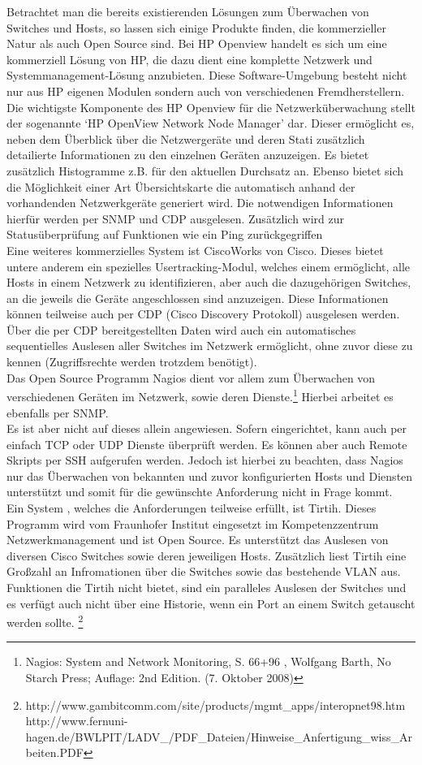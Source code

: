 Betrachtet man die bereits existierenden Lösungen zum Überwachen von Switches und Hosts, so lassen sich einige Produkte finden, die kommerzieller Natur als auch Open Source sind.
Bei HP Openview handelt es sich um eine kommerziell Lösung von HP, die dazu dient eine komplette Netzwerk und Systemmanagement-Lösung anzubieten. Diese Software-Umgebung besteht nicht nur aus HP eigenen Modulen sondern auch von verschiedenen Fremdherstellern.
Die wichtigste Komponente des HP Openview für die Netzwerküberwachung stellt der sogenannte ‘HP OpenView Network Node Manager’ dar.
Dieser ermöglicht es, neben dem Überblick über die Netzwergeräte und deren Stati zusätzlich detailierte Informationen zu den einzelnen Geräten anzuzeigen. Es bietet zusätzlich Histogramme z.B. für den aktuellen Durchsatz an.
Ebenso bietet sich die Möglichkeit einer Art Übersichtskarte die automatisch anhand der vorhandenden Netzwerkgeräte generiert wird. Die notwendigen Informationen hierfür werden per SNMP und CDP ausgelesen. Zusätzlich wird zur Statusüberprüfung auf Funktionen wie ein Ping zurückgegriffen\\
Eine weiteres kommerzielles System ist CiscoWorks von Cisco. Dieses bietet untere anderem ein spezielles Usertracking-Modul, welches einem ermöglicht, alle Hosts in einem Netzwerk zu identifizieren, aber auch die dazugehörigen Switches, an die jeweils die Geräte angeschlossen sind anzuzeigen. Diese Informationen können teilweise auch per CDP (Cisco Discovery Protokoll) ausgelesen werden. Über die per CDP bereitgestellten Daten wird auch ein automatisches sequentielles Auslesen aller Switches im Netzwerk ermöglicht, ohne zuvor diese zu kennen (Zugriffsrechte werden trotzdem benötigt).\\
Das Open Source Programm Nagios dient vor allem zum Überwachen von verschiedenen Geräten im Netzwerk, sowie deren Dienste.\footnote{Nagios: System and Network Monitoring, S. 66+96 , Wolfgang Barth, No Starch Press; Auflage: 2nd Edition. (7. Oktober 2008)}
Hierbei arbeitet es ebenfalls per SNMP.\\
Es ist aber nicht auf dieses allein angewiesen. Sofern eingerichtet, kann auch per einfach TCP oder UDP Dienste überprüft werden.
Es können aber auch Remote Skripts per SSH aufgerufen werden.
Jedoch ist hierbei zu beachten, dass Nagios nur das Überwachen von bekannten und zuvor konfigurierten Hosts und Diensten unterstützt und somit für die gewünschte Anforderung nicht in Frage kommt.\\
Ein System , welches die Anforderungen teilweise erfüllt, ist Tirtih.
Dieses Programm wird vom Fraunhofer Institut eingesetzt im Kompetenzzentrum Netzwerkmanagement und ist Open Source. Es unterstützt das Auslesen von diversen Cisco Switches sowie deren jeweiligen Hosts.
Zusätzlich liest Tirtih eine Großzahl an Infromationen über die Switches sowie das bestehende VLAN aus.
Funktionen die Tirtih nicht bietet, sind ein paralleles Auslesen der Switches und es verfügt auch nicht über eine Historie, wenn ein Port an einem Switch getauscht werden sollte.
\footnote{http://www.gambitcomm.com/site/products/mgmt\_apps/interopnet98.htm
http://www.fernuni-hagen.de/BWLPIT/LADV\_/PDF\_Dateien/Hinweise\_Anfertigung\_wiss\_Arbeiten.PDF}

